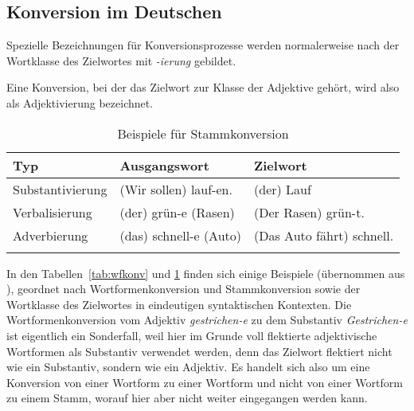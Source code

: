\subsection{Konversion im Deutschen}

\label{sec:konvdeutsch}

Spezielle Bezeichnungen für Konversionsprozesse werden normalerweise nach der Wortklasse des Zielwortes mit \textit{-ierung} gebildet.

\begin{table}
  \centering
  \caption{Beispiele für Wortformenkonversion}
  \label{tab:wfkonv}
\end{table}

Eine Konversion, bei der das Zielwort zur Klasse der Adjektive gehört, wird also als Adjektivierung bezeichnet.

\begin{table}
  \centering
  \begin{tabular}{lll}
    \lsptoprule
    \textbf{Typ} & \textbf{Ausgangswort} & \textbf{Zielwort} \\
    \midrule
    Substantivierung & (Wir sollen) lauf-en. & (der) Lauf \\
    Verbalisierung & (der) grün-e (Rasen) & (Der Rasen) grün-t.\\
    Adverbierung & (das) schnell-e (Auto) & (Das Auto fährt) schnell. \\
    \lspbottomrule
  \end{tabular}
  \caption{Beispiele für Stammkonversion}
  \label{tab:stammkonv}
\end{table}

In den Tabellen~\ref{tab:wfkonv} und \ref{tab:stammkonv} finden sich einige Beispiele (übernommen aus \citealp[280]{Eisenberg1}), geordnet nach Wortformenkonversion und Stammkonversion sowie der Wortklasse des Zielwortes in eindeutigen syntaktischen Kontexten.
Die Wortformenkonversion vom Adjektiv \textit{gestrichen-e} zu dem Substantiv \textit{Gestrichen-e} ist eigentlich ein Sonderfall, weil hier im Grunde voll flektierte adjektivische Wortformen als Substantiv verwendet werden, denn das Zielwort flektiert nicht wie ein Substantiv, sondern wie ein Adjektiv.
Es handelt sich also um eine Konversion von einer Wortform zu einer Wortform und nicht von einer Wortform zu einem Stamm, worauf hier aber nicht weiter eingegangen werden kann.

